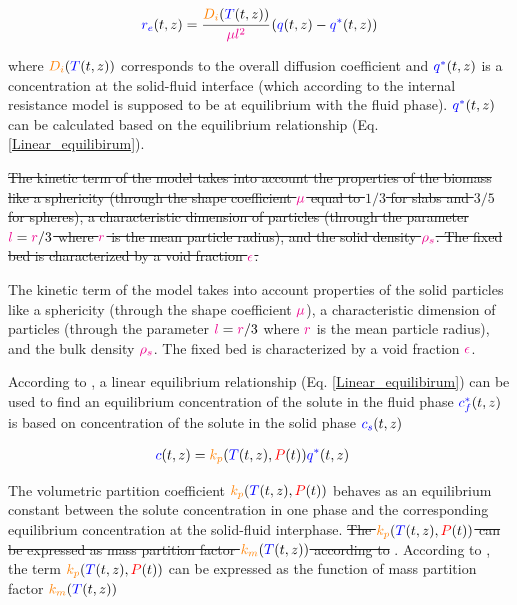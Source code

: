 \documentclass[../Parameter_fitting.tex]{subfiles}
\begin{document}
			{\footnotesize
				\begin{equation} \label{Model_kinetic_basic}
					{\color{blue}r_e}(t,z) = \cfrac{{\color{orange}D_i}({\color{blue}T}(t,z))}{{\color{magenta} \mu l^2} }\left({\color{blue}q}(t,z) - {\color{blue}q^*}(t,z) \right)
			\end{equation} }
			
			where ${\color{orange}D_i}({\color{blue}T}(t,z))$ corresponds to the overall diffusion coefficient and ${\color{blue}q^*}(t,z)$ is a concentration at the solid-fluid interface (which according to the internal resistance model is supposed to be at equilibrium with the fluid phase). ${\color{blue}q^*}(t,z)$ can be calculated based on the equilibrium relationship (Eq.  \ref{Linear_equilibirum}). 
			
			\sout{The kinetic term of the model takes into account the properties of the biomass like a sphericity (through the shape coefficient ${\color{magenta}\mu}$ equal to $1/3$ for slabs and $3/5$ for spheres), a characteristic dimension of particles (through the parameter ${\color{magenta}l} = {\color{magenta}r}/3$ where ${\color{magenta}r}$ is the mean particle radius), and the solid density ${\color{magenta}\rho_s}$. The fixed bed is characterized by a void fraction ${\color{magenta}\epsilon}$. }
			
			{\color{blue} The kinetic term of the model takes into account properties of the solid particles like a sphericity (through the shape coefficient ${\color{magenta}\mu}$), a characteristic dimension of particles (through the parameter ${\color{magenta}l} = {\color{magenta}r}/3$ where ${\color{magenta}r}$ is the mean particle radius), and the bulk density ${\color{magenta}\rho_s}$. The fixed bed is characterized by a void fraction ${\color{magenta}\epsilon}$. }
			
			According to \citet{Bulley1984}, a linear equilibrium relationship (Eq.  \ref{Linear_equilibirum}) can be used to find an equilibrium concentration of the solute in the fluid phase ${\color{blue}c_f^*}(t,z)$ is based on concentration of the solute in the solid phase ${\color{blue}c_s}(t,z)$ 
			
			{\footnotesize
				\begin{align} \label{Linear_equilibirum}
					{\color{blue}c}(t,z) &= {\color{orange}k_p}({\color{blue}T}(t,z),{\color{red}P}(t)) \allowbreak {\color{blue}q^*}(t,z)
			\end{align} }
			
			The volumetric partition coefficient ${\color{orange}k_p}({\color{blue}T}(t,z),{\color{red}P}(t))$ behaves as an equilibrium constant between the solute concentration in one phase and the corresponding equilibrium concentration at the solid-fluid interphase. \sout{ The ${\color{orange}k_p}({\color{blue}T}(t,z),{\color{red}P}(t))$ can be expressed as mass partition factor ${\color{orange}k_m}({\color{blue}T}(t,z))$ according to} \citet{Spiro2007} .
			{\color{blue} According to \citet{Spiro2007}, the term ${\color{orange}k_p}({\color{blue}T}(t,z),{\color{red}P}(t))$ can be expressed as the function of mass partition factor ${\color{orange}k_m}({\color{blue}T}(t,z))$ } 
			
\end{document}
